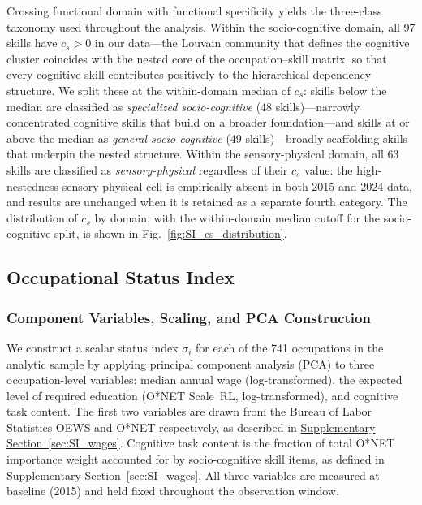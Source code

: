 \documentclass[11pt, letterpaper]{article} %
\begin{document}
Crossing functional domain with functional specificity yields the three-class taxonomy used throughout the analysis. Within the socio-cognitive domain, all 97 skills have $c_s > 0$ in our data---the Louvain community that defines the cognitive cluster coincides with the nested core of the occupation--skill matrix, so that every cognitive skill contributes positively to the hierarchical dependency structure. We split these at the within-domain median of $c_s$: skills below the median are classified as \textit{specialized socio-cognitive} (48 skills)---narrowly concentrated cognitive skills that build on a broader foundation---and skills at or above the median as \textit{general socio-cognitive} (49 skills)---broadly scaffolding skills that underpin the nested structure. Within the sensory-physical domain, all 63 skills are classified as \textit{sensory-physical} regardless of their $c_s$ value: the high-nestedness sensory-physical cell is empirically absent in both 2015 and 2024 data, and results are unchanged when it is retained as a separate fourth category. The distribution of $c_s$ by domain, with the within-domain median cutoff for the socio-cognitive split, is shown in Fig.~\ref{fig:SI_cs_distribution}.



 
\subsection{Occupational Status Index}
\label{sec:SI_status}
 
\subsubsection{Component Variables, Scaling, and PCA Construction}
\label{sec:SI_pca}
 
We construct a scalar status index $\sigma_i$ for each of the 741 occupations in the analytic sample by applying principal component analysis (PCA) to three occupation-level variables: median annual wage (log-transformed), the expected level of required education (O*NET Scale~RL, log-transformed), and cognitive task content. The first two variables are drawn from the Bureau of Labor Statistics OEWS and O*NET respectively, as described in \hyperref[sec:SI_wages]{Supplementary Section~\ref*{sec:SI_wages}}. Cognitive task content is the fraction of total O*NET importance weight accounted for by socio-cognitive skill items, as defined in \hyperref[sec:SI_wages]{Supplementary Section~\ref*{sec:SI_wages}}. All three variables are measured at baseline (2015) and held fixed throughout the observation window.
 
\end{document}
